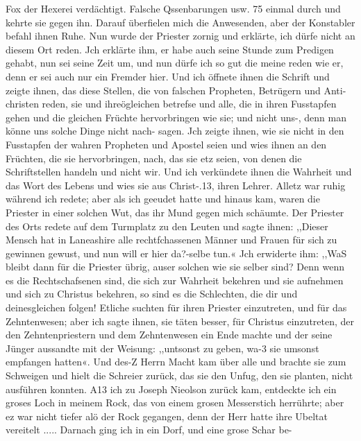 Fox der Hexerei verdächtigt. Falsche Qssenbarungen usw. 75
einmal durch und kehrte sie gegen ihn. Darauf überfielen mich
die Anwesenden, aber der Konstabler befahl ihnen Ruhe. Nun
wurde der Priester zornig und erklärte, ich dürfe nicht an diesem
Ort reden. Jch erklärte ihm, er habe auch seine Stunde zum
Predigen gehabt, nun sei seine Zeit um, und nun dürfe ich so
gut die meine reden wie er, denn er sei auch nur ein Fremder
hier. Und ich öffnete ihnen die Schrift und zeigte ihnen, das
diese Stellen, die von falschen Propheten, Betrügern und Anti-
christen reden, sie und ihreögleichen betrefse und alle, die in ihren
Fusstapfen gehen und die gleichen Früchte hervorbringen wie sie;
und nicht uns-, denn man könne uns solche Dinge nicht nach-
sagen. Jch zeigte ihnen, wie sie nicht in den Fusstapfen der
wahren Propheten und Apostel seien und wies ihnen an den
Früchten, die sie hervorbringen, nach, das sie etz seien, von denen
die Schriftstellen handeln und nicht wir. Und ich verkündete ihnen
die Wahrheit und das Wort des Lebens und wies sie aus Christ-.13,
ihren Lehrer. Alletz war ruhig während ich redete; aber als ich
geeudet hatte und hinaus kam, waren die Priester in einer solchen
Wut, das ihr Mund gegen mich schäumte. Der Priester des
Orts redete auf dem Turmplatz zu den Leuten und sagte ihnen:
,,Dieser Mensch hat in Laneashire alle rechtfchassenen Männer
und Frauen für sich zu gewinnen gewust, und nun will er hier
da?-selbe tun.« Jch erwiderte ihm: ,,WaS bleibt dann für die
Priester übrig, auser solchen wie sie selber sind? Denn wenn es
die Rechtschafsenen sind, die sich zur Wahrheit bekehren und sie
aufnehmen und sich zu Christus bekehren, so sind es die Schlechten,
die dir und deinesgleichen folgen! Etliche suchten für ihren Priester
einzutreten, und für das Zehntenwesen; aber ich sagte ihnen, sie
täten besser, für Christus einzutreten, der den Zehntenpriestern
und dem Zehntenwesen ein Ende machte und der seine Jünger
aussandte mit der Weisung: ,,untsonst zu geben, wa-3 sie umsonst
empfangen hatten«. Und des-Z Herrn Macht kam über alle und brachte
sie zum Schweigen und hielt die Schreier zurück, das sie den Unfug,
den sie planten, nicht ausführen konnten. A13 ich zu Joseph
Nieolson zurück kam, entdeckte ich ein groses Loch in meinem
Rock, das von einem grosen Messerstich herrührte; aber ez war
nicht tiefer alö der Rock gegangen, denn der Herr hatte ihre
Ubeltat vereitelt .....
Darnach ging ich in ein Dorf, und eine grose Schar be-


